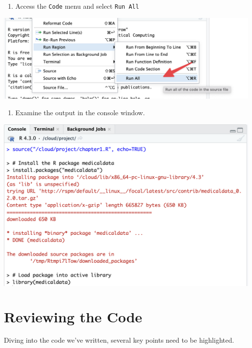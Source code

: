 \documentclass[
  letterpaper,
  DIV=11,
  numbers=noendperiod]{scrreprt}
\providecommand{\tightlist}{%
  \setlength{\itemsep}{0pt}\setlength{\parskip}{0pt}}\usepackage{longtable,booktabs,array}
\begin{document}
\begin{enumerate}
\def\labelenumi{\arabic{enumi}.}
\setcounter{enumi}{4}
\tightlist
\item
  Access the \texttt{Code} menu and select \texttt{Run\ All}
\end{enumerate}

\includegraphics{./images/CleanShot 2023-06-12 at 22.26.59@2x.png}

\begin{enumerate}
\def\labelenumi{\arabic{enumi}.}
\setcounter{enumi}{5}
\tightlist
\item
  Examine the output in the console window.
\end{enumerate}

\includegraphics{./images/CleanShot 2023-06-12 at 22.29.32@2x.png}

\hypertarget{reviewing-the-code}{%
\section{Reviewing the Code}\label{reviewing-the-code}}

Diving into the code we've written, several key points need to be
highlighted.
\end{document}
